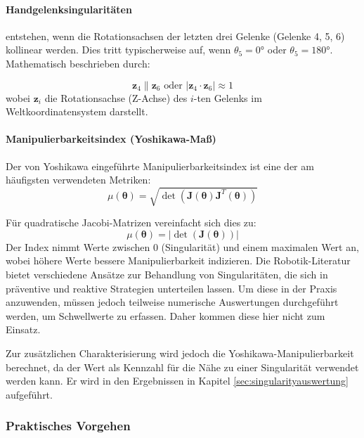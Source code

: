 \paragraph{Handgelenksingularitäten} entstehen, wenn die Rotationsachsen der
letzten drei Gelenke (Gelenke 4, 5, 6) kollinear werden. Dies tritt
typischerweise auf, wenn $\theta_5 = 0°$ oder $\theta_5 = 180°$. Mathematisch
beschrieben durch:

\begin{equation}
	\mathbf{z}_4 \parallel \mathbf{z}_6 \text{ oder } |\mathbf{z}_4 \cdot \mathbf{z}_6| \approx 1
	\label{eq:wrist_singularity}
\end{equation}
\noindent
wobei $\mathbf{z}_i$ die Rotationsachse (Z-Achse) des $i$-ten Gelenks im
Weltkoordinatensystem darstellt.

\paragraph{Manipulierbarkeitsindex (Yoshikawa-Maß)} Der von Yoshikawa
\cite{yoshikawa1985manipulability} eingeführte Manipulierbarkeitsindex ist eine
der am häufigsten verwendeten Metriken: \begin{equation}
	\mu(\boldsymbol{\theta}) =
	\sqrt{\det(\mathbf{J}(\boldsymbol{\theta})\mathbf{J}^T(\boldsymbol{\theta}))}
	\label{eq:yoshikawa_measure} \end{equation}

Für quadratische Jacobi-Matrizen vereinfacht sich dies zu: \begin{equation}
	\mu(\boldsymbol{\theta}) = |\det(\mathbf{J}(\boldsymbol{\theta}))|
	\label{eq:yoshikawa_simplified} \end{equation}
\noindent
Der Index nimmt Werte zwischen 0 (Singularität) und einem maximalen Wert an,
wobei höhere Werte bessere Manipulierbarkeit indizieren. Die Robotik-Literatur
bietet verschiedene Ansätze zur Behandlung von Singularitäten, die sich in
präventive und reaktive Strategien unterteilen lassen. Um diese in der Praxis
anzuwenden, müssen jedoch teilweise numerische Auswertungen durchgeführt werden,
um Schwellwerte zu erfassen. Daher kommen diese hier nicht zum Einsatz.

Zur zusätzlichen Charakterisierung wird jedoch die Yoshikawa-Manipulierbarkeit
berechnet, da der Wert als Kennzahl für die Nähe zu einer Singularität verwendet
werden kann. Er wird in den Ergebnissen in Kapitel \ref{sec:singularityauswertung} aufgeführt.

\subsubsection{Praktisches Vorgehen} \label{sssec:Framework_Implementierung}

